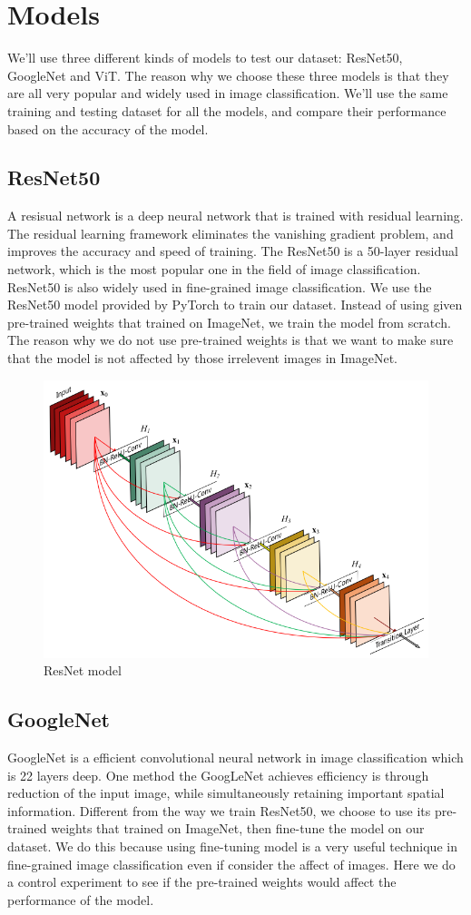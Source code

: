 \documentclass[conference]{IEEEtran}
\begin{document}
\section{Models}

We'll use three different kinds of models to test our dataset: ResNet50, GoogleNet and ViT. The reason why we choose these three models is that they are all very popular and widely used in image classification. We'll use the same training and testing dataset for all the models, and compare their performance based on the accuracy of the model.

\subsection{ResNet50}
A resisual network is a deep neural network that is trained with residual learning. The residual learning framework eliminates the vanishing gradient problem, and improves the accuracy and speed of training. The ResNet50 is a 50-layer residual network, which is the most popular one in the field of image classification. ResNet50 is also widely
used in fine-grained image classification. We use the ResNet50 model provided by PyTorch to train our dataset. Instead of using given pre-trained weights that trained on ImageNet, we train the model from scratch. The reason why we do not use pre-trained weights is that we want to make sure that the model is not affected by those irrelevent
images in ImageNet.

\begin{figure}[h]
\centering
  \includegraphics[width=0.6\linewidth]{resnet_model.png}
\caption{ResNet model}
\end{figure}

\subsection{GoogleNet}

GoogleNet is a efficient convolutional neural network in image classification which is 22 layers deep. One method the GoogLeNet achieves efficiency is through reduction of the input image, while simultaneously retaining important spatial information. Different from the way we train ResNet50, we choose to use its pre-trained weights that trained on ImageNet,
then fine-tune the model on our dataset. We do this because using fine-tuning model is a very useful technique in fine-grained image classification even if consider the affect of images. Here we do a control experiment to see if the pre-trained weights would affect the performance of the model.
\end{document}
